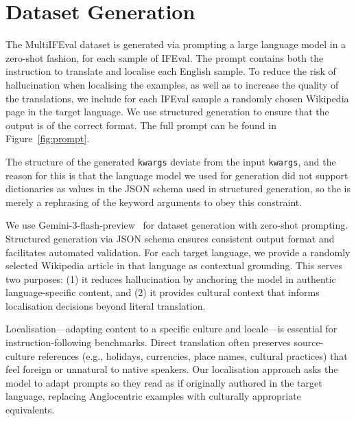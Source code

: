 \documentclass[11pt]{article}
\begin{document}
\section{Dataset Generation}
\label{sec:dataset-generation}

The MultiIFEval dataset is generated via prompting a large language model in a zero-shot
fashion, for each sample of IFEval. The prompt contains both the instruction to
translate and localise each English sample. To reduce the risk of hallucination when
localising the examples, as well as to increase the quality of the translations, we
include for each IFEval sample a randomly chosen Wikipedia page in the target language.
We use structured generation to ensure that the output is of the correct format. The
full prompt can be found in Figure~\ref{fig:prompt}.

The structure of the generated \texttt{kwargs} deviate from the input \texttt{kwargs},
and the reason for this is that the language model we used for generation did not
support dictionaries as values in the JSON schema used in structured generation, so the
is merely a rephrasing of the keyword arguments to obey this constraint.

We use Gemini-3-flash-preview~\cite{google-ai2026gemini-3-flash-preview} for dataset generation with zero-shot
prompting. Structured generation via JSON schema ensures consistent output format and
facilitates automated validation. For each target language, we provide a randomly
selected Wikipedia article in that language as contextual grounding. This serves two
purposes: (1) it reduces hallucination by anchoring the model in authentic
language-specific content, and (2) it provides cultural context that informs
localisation decisions beyond literal translation.

Localisation---adapting content to a specific culture and locale---is essential for
instruction-following benchmarks. Direct translation often preserves source-culture
references (e.g., holidays, currencies, place names, cultural practices) that feel
foreign or unnatural to native speakers. Our localisation approach asks the model to
adapt prompts so they read as if originally authored in the target language, replacing
Anglocentric examples with culturally appropriate equivalents.
\end{document}
